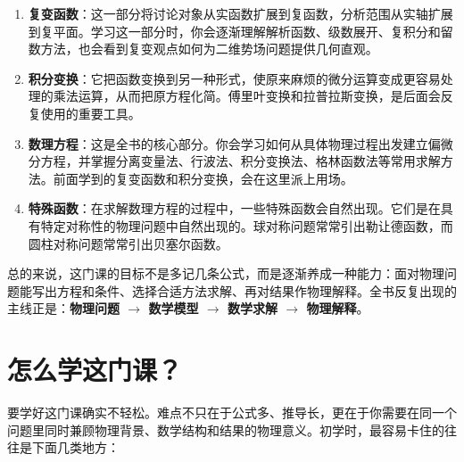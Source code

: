 \begin{enumerate}
    \item \textbf{复变函数}：这一部分将讨论对象从实函数扩展到复函数，分析范围从实轴扩展到复平面。学习这一部分时，你会逐渐理解解析函数、级数展开、复积分和留数方法，也会看到复变观点如何为二维势场问题提供几何直观。
    
    \item \textbf{积分变换}：它把函数变换到另一种形式，使原来麻烦的微分运算变成更容易处理的乘法运算，从而把原方程化简。傅里叶变换和拉普拉斯变换，是后面会反复使用的重要工具。
    
    \item \textbf{数理方程}：这是全书的核心部分。你会学习如何从具体物理过程出发建立偏微分方程，并掌握分离变量法、行波法、积分变换法、格林函数法等常用求解方法。前面学到的复变函数和积分变换，会在这里派上用场。
    
    \item \textbf{特殊函数}：在求解数理方程的过程中，一些特殊函数会自然出现。它们是在具有特定对称性的物理问题中自然出现的。球对称问题常常引出勒让德函数，而圆柱对称问题常常引出贝塞尔函数。
\end{enumerate}

\medskip

总的来说，这门课的目标不是多记几条公式，而是逐渐养成一种能力：面对物理问题能写出方程和条件、选择合适方法求解、再对结果作物理解释。全书反复出现的主线正是：\textbf{物理问题 $\rightarrow$ 数学模型 $\rightarrow$ 数学求解 $\rightarrow$ 物理解释}。

\section*{怎么学这门课？}

要学好这门课确实不轻松。难点不只在于公式多、推导长，更在于你需要在同一个问题里同时兼顾物理背景、数学结构和结果的物理意义。初学时，最容易卡住的往往是下面几类地方：

